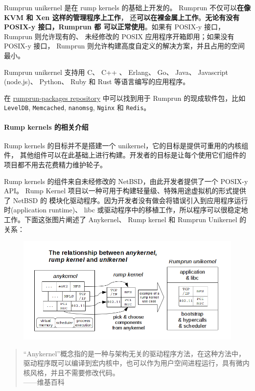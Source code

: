 \documentclass[UTF8,fontset=none,linespread=1.15]{ctexart}
\let\nosupcite\cite
\renewcommand*{\cite}[1]{\textsuperscript{\nosupcite{#1}}}
\begin{document}
Rumprun unikernel 是在 rump kernels 的基础上开发的。
Rumprun 不仅可以\textbf{在像 KVM 和 Xen 这样的管理程序上工作}，
还\textbf{可以在裸金属上工作}。\textbf{无论有没有 POSIX-y 接口，Rumprun 都
可以正常使用}。如果有 POSIX-y 接口，Rumprun 则允许现有的、
未经修改的 POSIX 应用程序开箱即用；如果没有 POSIX-y 接口，
Rumprun 则允许构建高度自定义的解决方案，并且占用的空间最小。

Rumprun unikernel 支持用 C、 C++ 、 Erlang、 Go、
Java、 Javascript (node.js)、 Python、 Ruby 和 Rust 等语言编写的应用程序。

在 \hyperlink{https://github.com/rumpkernel/rumprun-packages}{rumprun-packages repository}
中可以找到用于 Rumprun 的现成软件包，比如 \texttt{LevelDB},
\texttt{Memcached}, \texttt{nanomsg}, \texttt{Nginx} 和 \texttt{Redis}。

\paragraph{Rump kernels 的相关介绍}\cite{bib:21-rump-kernel}\cite{bib:22-xen}

Rump kernels 的目标并不是搭建一个 unikernel，它的目标是提供可重用的内核组件，
其他组件可以在此基础上进行构建。开发者的目标是让每个使用它们组件的项目都不用去花费精力维护轮子。

Rump kernels 的组件来自未经修改的 NetBSD，由此开发者提供了一个 POSIX-y API。
Rump Kernel 项目以一种可用于构建轻量级、特殊用途虚拟机的形式提供了 NetBSD 的
模块化驱动程序。因为开发者没有做会将错误引入到应用程序运行时(application runtime)、
libc 或驱动程序中的移植工作，所以程序可以很稳定地工作。下面这张图片阐述了 Anykernel、
Rump kernel 和 Rumprun Unikernel 的关系：
\begin{figure}[H]
\includegraphics[width=\linewidth]{pictures/rumprun-1.png}
\caption{}
\end{figure}

\begin{quote}
“Anykernel”概念指的是一种与架构无关的驱动程序方法，在这种方法中，驱动程序既可以编译到宏内核中，也可以作为用户空间进程运行，具有微内核风格，并且不需要修改代码。\\
\hfill——维基百科
\end{quote}
\end{document}
